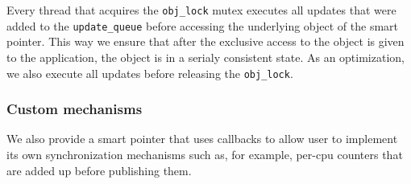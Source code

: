 Every thread that acquires the {\tt obj\_lock} mutex executes all updates that were added to the {\tt update\_queue} before accessing the underlying object of the smart pointer. This way we ensure that after the exclusive access to the object is given to the application, the object is in a serialy consistent state. As an optimization, we also execute all updates before releasing the {\tt obj\_lock}.

\subsubsection*{Custom mechanisms}

We also provide a smart pointer that uses callbacks to allow user to implement its own synchronization mechanisms such as, for example, per-cpu counters that are added up before publishing them.